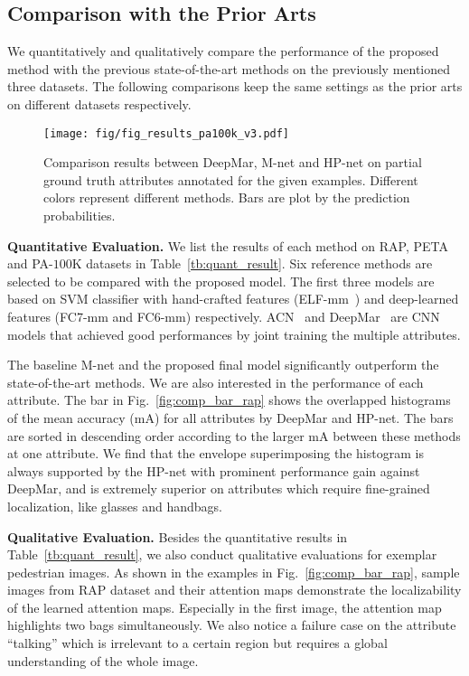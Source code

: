 \documentclass[10pt,twocolumn,letterpaper]{article}
\begin{document}
\subsection{Comparison with the Prior Arts}
\label{subsec:attribute_comp_results}

We quantitatively and qualitatively compare the performance of the proposed method with the previous state-of-the-art methods on the previously mentioned three datasets.
The following comparisons keep the same settings as the prior arts on different datasets respectively.





\begin{figure}[t]
\centering
\texttt{[image: fig/fig\_results\_pa100k\_v3.pdf]}
\caption{
Comparison results between DeepMar, M-net and HP-net on partial ground truth attributes annotated for the given examples. Different colors represent different methods. Bars are plot by the prediction probabilities.
}
\label{fig:result_pa100k}
\vspace{-0.2cm}
\end{figure}


\noindent\textbf{Quantitative Evaluation.}
We list the results of each method on RAP, PETA and PA-$100$K datasets in Table~\ref{tb:quant_result}.
Six reference methods are selected to be compared with the proposed model.
The first three models are based on SVM classifier with hand-crafted features (ELF-mm~\cite{gray2008viewpoint,prosser2010person}) and deep-learned features (FC7-mm and FC6-mm) respectively.
ACN~\cite{sudowe2015person} and DeepMar~\cite{li2015multi} are CNN models that achieved good performances by joint training the multiple attributes.

The baseline M-net and the proposed final model significantly outperform the state-of-the-art methods.
We are also interested in the performance of each attribute.
The bar in Fig.~\ref{fig:comp_bar_rap} shows the overlapped histograms of the mean accuracy (mA) for all attributes by DeepMar and HP-net.
The bars are sorted in descending order according to the larger mA between these methods at one attribute.
We find that the envelope superimposing the histogram is always supported by the HP-net with prominent performance gain against DeepMar, and is extremely superior on attributes which require fine-grained localization, like glasses and handbags.

\noindent\textbf{Qualitative Evaluation.}
Besides the quantitative results in Table~\ref{tb:quant_result}, we also conduct qualitative evaluations for exemplar pedestrian images.
As shown in the examples in Fig.~\ref{fig:comp_bar_rap}, sample images from RAP dataset and their attention maps demonstrate the localizability of the learned attention maps.
Especially in the first image, the attention map highlights two bags simultaneously.
We also notice a failure case on the attribute ``talking'' which is irrelevant to a certain region but requires a global understanding of the whole image.
\end{document}
